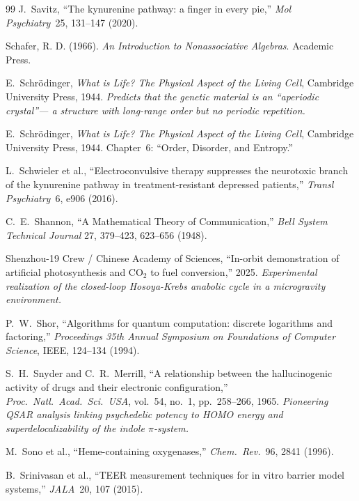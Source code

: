 \documentclass[12pt,oneside]{book}
\theoremstyle{principia}
\theoremstyle{definition}
\theoremstyle{remark}
\begin{document}
\begin{thebibliography}{99}
J.~Savitz, ``The kynurenine pathway: a finger in every pie,'' \emph{Mol Psychiatry}\ 25, 131--147 (2020).

Schafer, R. D. (1966). \emph{An Introduction to Nonassociative Algebras}. Academic Press.

E.~Schr\"odinger,
\emph{What is Life? The Physical Aspect of the Living Cell},
Cambridge University Press, 1944.
\textit{Predicts that the genetic material is an ``aperiodic crystal''---
a structure with long-range order but no periodic repetition.}

E.~Schr\"odinger,
\emph{What is Life? The Physical Aspect of the Living Cell},
Cambridge University Press, 1944.
Chapter~6: ``Order, Disorder, and Entropy.''

L.~Schwieler et al., ``Electroconvulsive therapy suppresses the neurotoxic branch of the kynurenine pathway in treatment-resistant depressed patients,'' \emph{Transl Psychiatry}\ 6, e906 (2016).

C.~E.~Shannon,
``A Mathematical Theory of Communication,''
\emph{Bell System Technical Journal} 27, 379--423, 623--656 (1948).

Shenzhou-19 Crew / Chinese Academy of Sciences,
``In-orbit demonstration of artificial photosynthesis and $\text{CO}_2$ to fuel conversion,''
2025.
\textit{Experimental realization of the closed-loop Hosoya-Krebs anabolic cycle in a microgravity environment.}

P.~W.~Shor,
``Algorithms for quantum computation: discrete logarithms and factoring,''
\emph{Proceedings 35th Annual Symposium on Foundations of Computer Science}, IEEE, 124--134 (1994).

S.~H.~Snyder and C.~R.~Merrill,
``A relationship between the hallucinogenic activity of drugs and their electronic configuration,''
\emph{Proc.\ Natl.\ Acad.\ Sci.\ USA}, vol.~54, no.~1, pp.~258--266, 1965.
\textit{Pioneering QSAR analysis linking psychedelic potency to HOMO energy and superdelocalizability of the indole $\pi$-system.}

M.~Sono et al., ``Heme-containing oxygenases,'' \emph{Chem.\ Rev.}\ 96, 2841 (1996).

B.~Srinivasan et al., ``TEER measurement techniques for in vitro barrier model systems,'' \emph{JALA}\ 20, 107 (2015).


\end{thebibliography}
\end{document}
